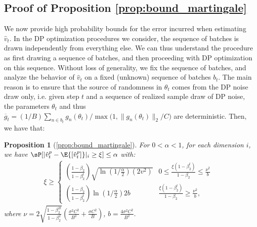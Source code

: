 \documentclass[letterpaper]{article} %
\newtheorem*{proposition*}{Proposition}
\begin{document}
\subsection{Proof of Proposition \ref{prop:bound_martingale}}\label{appendix:bound_martingale}

We now provide high probability bounds for the error incurred when estimating $\hat{v}_t$.
In the DP optimization procedures we consider, the sequence of batches is drawn independently from everything else. We can thus understand the procedure as first drawing a sequence of batches, and then proceeding with DP optimization on this sequence. Without loss of generality, we fix the sequence of batches, and analyze the behavior of $\hat{v}_t$ on a fixed (unknown) sequence of batches $b_t$. The main reason is to ensure that the source of randomness in $\theta_t$ comes from the DP noise draw only, i.e. given step $t$ and a sequence of realized sample draw of DP noise, the parameters $\theta_t$ and thus $\overline{g}_t = (1/B)\sum_{n \in b_t} g_{n}(\theta_t) / {\max{(1, \lVert g_n(\theta_t) \rVert_{2}/C})}$ are deterministic. Then, we have that:

\begin{proposition*}[\ref{prop:bound_martingale}]
        For $0 < \alpha < 1$, for each dimension $i$, we have $\sP[\lvert \hat{v}_t^p - \E{[\hat{v}_t^p]} \rvert_i \geq \xi] \leq \alpha$ with:
    \begin{align*}
    \xi \geq
    \begin{cases}
        (\frac{1-\beta_2}{1-\beta_2^t}) \sqrt{\ln{(1/\frac{\alpha}{2})}(2v^2)}
        & 0 \leq \frac{\xi(1-\beta_2^t)}{1-\beta_2}  \leq \frac{\nu^2}{b} \\
        (\frac{1-\beta_2}{1-\beta_2^t}) \ln{(1/\frac{\alpha}{2})}2b
        & \frac{\xi(1-\beta_2^t)}{1-\beta_2}  \geq \frac{\nu^2}{b},
    \end{cases}
\end{align*}
where $\nu = 2\sqrt{\frac{1-\beta_2^{2t}}{1-\beta_2^2}}( \frac{\sigma^2C^2}{B^2} + \frac{\sigma C^2}{B} )$, $b = \frac{4\sigma^2C^2}{B^2}$.
\end{proposition*}
\end{document}
